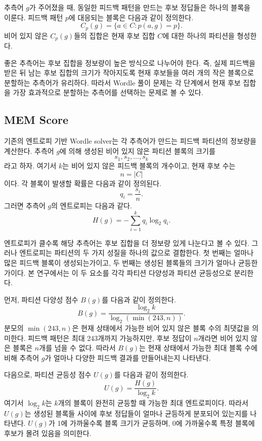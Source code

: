 \documentclass[11pt]{article}
\begin{document}
추측어 $g$가 주어졌을 때, 동일한 피드백 패턴을 만드는 후보 정답들은 하나의 블록을 이룬다.
피드백 패턴 $p$에 대응되는 블록은 다음과 같이 정의한다.
\[
C_p(g) = \{ a \in C : p(a,g) = p \}.
\]
비어 있지 않은 $C_p(g)$들의 집합은 현재 후보 집합 $C$에 대한 하나의 파티션을 형성한다.

좋은 추측어는 후보 집합을 정보량이 높은 방식으로 나누어야 한다.
즉, 실제 피드백을 받은 뒤 남는 후보 집합의 크기가 작아지도록 현재 후보들을 여러 개의 작은 블록으로 분할하는 추측어가 유리하다.
따라서 Wordle 풀이 문제는 각 단계에서 현재 후보 집합을 가장 효과적으로 분할하는 추측어를 선택하는 문제로 볼 수 있다.

\subsection{MEM Score}

기존의 엔트로피 기반 Wordle solver는 각 추측어가 만드는 피드백 파티션의 정보량을 계산한다.
추측어 $g$에 의해 생성된 비어 있지 않은 파티션 블록의 크기를
\[
s_1, s_2, \ldots, s_k
\]
라고 하자.
여기서 $k$는 비어 있지 않은 피드백 블록의 개수이고, 현재 후보 수는
\[
n = |C|
\]
이다.
각 블록이 발생할 확률은 다음과 같이 정의된다.
\[
q_i = \frac{s_i}{n}.
\]
그러면 추측어 $g$의 엔트로피는 다음과 같다.
\[
H(g) = - \sum_{i=1}^{k} q_i \log_2 q_i.
\]

엔트로피가 클수록 해당 추측어는 후보 집합을 더 정보량 있게 나눈다고 볼 수 있다.
그러나 엔트로피는 파티션의 두 가지 성질을 하나의 값으로 결합한다.
첫 번째는 얼마나 많은 피드백 블록이 생성되는가이고, 두 번째는 생성된 블록들의 크기가 얼마나 균등한가이다.
본 연구에서는 이 두 요소를 각각 파티션 다양성과 파티션 균등성으로 분리한다.

먼저, 파티션 다양성 점수 $B(g)$를 다음과 같이 정의한다.
\[
B(g) =
\frac{\log_2 k}{\log_2(\min(243,n))}.
\]
분모의 $\min(243,n)$은 현재 상태에서 가능한 비어 있지 않은 블록 수의 최댓값을 의미한다.
피드백 패턴은 최대 243개까지 가능하지만, 후보 정답이 $n$개라면 비어 있지 않은 블록은 $n$개를 넘을 수 없다.
따라서 $B(g)$는 현재 상태에서 가능한 최대 블록 수에 비해 추측어 $g$가 얼마나 다양한 피드백 결과를 만들어내는지 나타낸다.

다음으로, 파티션 균등성 점수 $U(g)$를 다음과 같이 정의한다.
\[
U(g) =
\frac{H(g)}{\log_2 k}.
\]
여기서 $\log_2 k$는 $k$개의 블록이 완전히 균등할 때 가능한 최대 엔트로피이다.
따라서 $U(g)$는 생성된 블록들 사이에 후보 정답들이 얼마나 균등하게 분포되어 있는지를 나타낸다.
$U(g)$가 1에 가까울수록 블록 크기가 균등하며, 0에 가까울수록 특정 블록에 후보가 몰려 있음을 의미한다.
\end{document}
